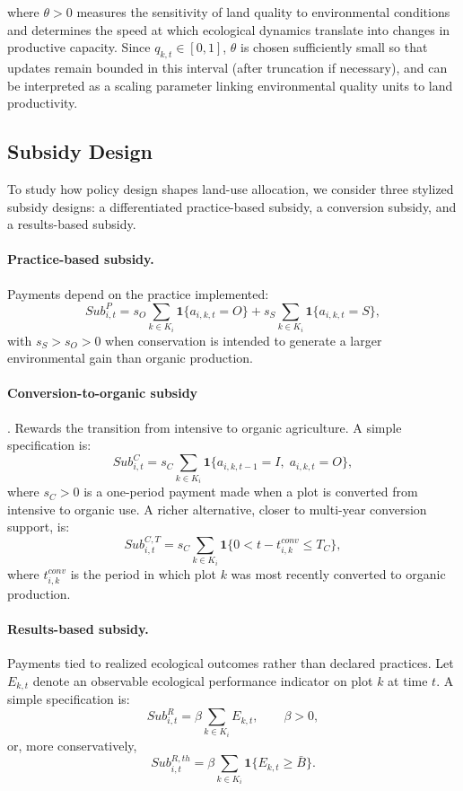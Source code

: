 \documentclass{article}
\begin{document}
where $\theta > 0$ measures the sensitivity of land quality to environmental conditions and determines the speed at which ecological dynamics translate into changes in productive capacity. Since $q_{k,t} \in [0,1]$, $\theta$ is chosen sufficiently small so that updates remain bounded in this interval (after truncation if necessary), and can be interpreted as a scaling parameter linking environmental quality units to land productivity.

\subsection{Subsidy Design}
To study how policy design shapes land-use allocation, we consider three stylized subsidy designs: a differentiated practice-based subsidy, a conversion subsidy, and a results-based subsidy.

\paragraph{Practice-based subsidy.} Payments depend on the practice implemented:
\[
Sub^{P}_{i,t} = s_O \sum_{k \in K_i} \mathbf{1}\{a_{i,k,t}=O\} + s_S \sum_{k \in K_i} \mathbf{1}\{a_{i,k,t}=S\},
\]
with $s_S > s_O > 0$ when conservation is intended to generate a larger environmental gain than organic production.


\paragraph{Conversion-to-organic subsidy}. Rewards the transition from intensive to organic agriculture. A simple specification is:
\[
Sub^{C}_{i,t} = s_C \sum_{k \in K_i} \mathbf{1}\{a_{i,k,t-1}=I,\; a_{i,k,t}=O\},
\]
where $s_C>0$ is a one-period payment made when a plot is converted from intensive to organic use. A richer alternative, closer to multi-year conversion support, is:
\[
Sub^{C,T}_{i,t} = s_C \sum_{k \in K_i} \mathbf{1}\{0 < t-t^{conv}_{i,k} \leq T_C\},
\]
where $t^{conv}_{i,k}$ is the period in which plot $k$ was most recently converted to organic production.

\paragraph{Results-based subsidy.} Payments tied to realized ecological outcomes rather than declared practices. Let $E_{k,t}$ denote an observable ecological performance indicator on plot $k$ at time $t$. A simple specification is:
\[
Sub^{R}_{i,t} = \beta \sum_{k \in K_i} E_{k,t}, \qquad \beta > 0,
\]
or, more conservatively,
\[
Sub^{R,th}_{i,t} = \beta \sum_{k \in K_i} \mathbf{1}\{E_{k,t} \geq \bar B\}.
\]
\end{document}
